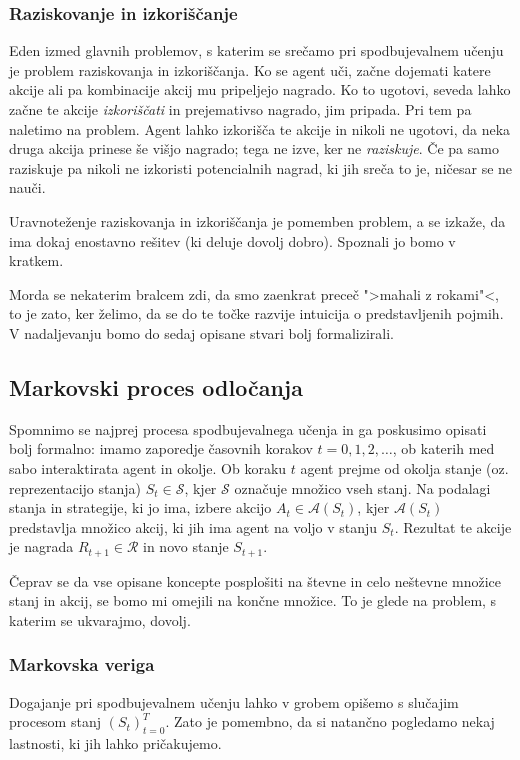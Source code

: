 \documentclass[12pt,a4paper]{amsart}
\theoremstyle{definition} %
\theoremstyle{plain} %
\begin{document}
\subsubsection{Raziskovanje in izkoriščanje}
Eden izmed glavnih problemov, s katerim se srečamo pri spodbujevalnem učenju je problem 
raziskovanja in izkoriščanja. Ko se agent uči, začne dojemati katere akcije ali pa kombinacije 
akcij mu pripeljejo nagrado. Ko to ugotovi, seveda lahko začne te akcije \textit{izkoriščati} 
in prejemativso nagrado, jim pripada. Pri tem pa naletimo na problem. Agent lahko izkorišča te 
akcije in nikoli ne ugotovi, da neka druga akcija prinese še višjo nagrado; tega ne izve, ker ne
\textit{raziskuje}. Če pa samo raziskuje pa nikoli ne izkoristi potencialnih nagrad, ki jih sreča
to je, ničesar se ne nauči. 

Uravnoteženje raziskovanja in izkoriščanja je pomemben problem, a se izkaže, da ima dokaj enostavno
rešitev (ki deluje dovolj dobro). Spoznali jo bomo v kratkem.

Morda se nekaterim bralcem zdi, da smo zaenkrat preceč ">mahali z rokami"<, to je zato, ker želimo, 
da se do te točke razvije intuicija o predstavljenih pojmih. V nadaljevanju bomo do sedaj opisane 
stvari bolj formalizirali.


\subsection{Markovski proces odločanja}
Spomnimo se najprej procesa spodbujevalnega učenja in ga poskusimo opisati bolj formalno: 
imamo zaporedje časovnih korakov $t = 0, 1, 2, \dots$, ob katerih med sabo interaktirata agent 
in okolje. Ob koraku $t$ agent prejme od okolja stanje (oz. reprezentacijo stanja) $S_t \in 
\mathcal{S}$, kjer $\mathcal{S}$ označuje množico vseh stanj. Na podalagi stanja in strategije, 
ki jo ima, izbere akcijo $A_t \in \mathcal{A}(S_t)$, kjer $\mathcal{A}(S_t)$ predstavlja 
množico akcij, ki jih ima agent na voljo v stanju $S_t$. Rezultat te akcije je nagrada $R_{t+1} 
\in \mathcal{R}$ in novo stanje $S_{t+1}$.

Čeprav se da vse opisane koncepte posplošiti na števne in celo neštevne množice stanj in akcij, 
se bomo mi omejili na končne množice. To je glede na problem, s katerim se ukvarajmo, dovolj.

\subsubsection{Markovska veriga}
Dogajanje pri spodbujevalnem učenju lahko v grobem opišemo s slučajim procesom stanj 
$(S_t)_{t=0}^T$. Zato je pomembno, da si natančno pogledamo nekaj lastnosti, ki jih 
lahko pričakujemo. 
\end{document}
